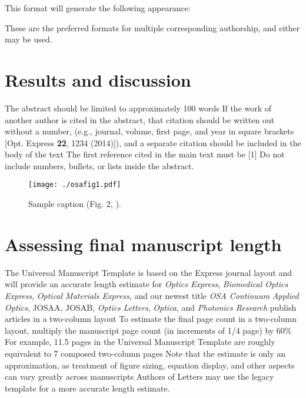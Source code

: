 \documentclass{osa-article}
\begin{document}
This format will generate the following appearance:

\medskip

\author{Author One and Author Two}

\address{Peer Review, Publications Department,
Optica Publishing Group, 2010 Massachusetts Avenue NW, Washington, DC 20036, USA\\
Publications Department, Optica Publishing Group, 2010 Massachusetts Avenue NW, Washington, DC 20036, USA\\
xyz@optica.org\\
opex@optica.org}
\medskip
These are the preferred
formats for multiple corresponding authorship, and either may be used.

\section{Results and discussion}
The abstract should be limited to approximately 100 words
If the work of another author is cited in the abstract, that citation should be written out without a number, (e.g., journal, volume, first page, and year in square brackets [Opt. Express {\bfseries 22}, 1234 (2014)]), and a separate citation should be included in the body of the text
The first reference cited in the main text must be [1]
Do not include numbers, bullets, or lists inside the abstract.

\begin{figure}[h!]
\centering\texttt{[image: ./osafig1.pdf]}
\caption{Sample caption (Fig. 2, \cite{Yelin:03}).}
\label{fig:1}
\end{figure}


\section{Assessing final manuscript length}
The Universal Manuscript Template is based on the Express journal layout and will provide an accurate length estimate for \emph{Optics Express}, \emph{Biomedical Optics Express},  \emph{Optical Materials Express}, and our newest title \emph{OSA Continuum}
\emph{Applied Optics}, JOSAA, JOSAB, \emph{Optics Letters}, \emph{Optica}, and \emph{Photonics Research} publish articles in a two-column layout
To estimate the final page count in a two-column layout, multiply the manuscript page count (in increments of 1/4 page) by 60\%
For example, 11.5 pages in the Universal Manuscript Template are roughly equivalent to 7 composed two-column pages
Note that the estimate is only an approximation, as treatment of figure sizing, equation display, and other aspects can vary greatly across manuscripts
Authors of Letters may use the legacy template for a more accurate length estimate.
\end{document}
